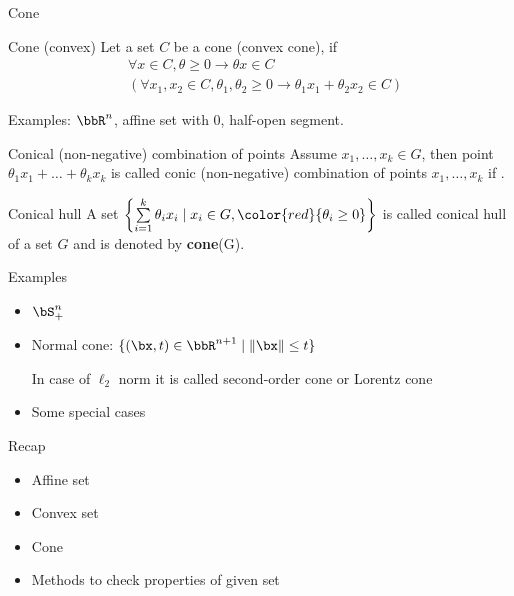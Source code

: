 \documentclass[12pt,russian]{beamer}
\begin{document}
\begin{frame}{Cone}
\small
\begin{block}{Cone (convex)}
Let a set $C$ be a cone (convex cone), if 
\vspace{-4mm}
\begin{equation*}
\begin{split}
& \forall x \in C, \theta \geq 0 \rightarrow \theta x \in C \\
& (\forall x_1, x_2 \in C, \theta_1, \theta_2 \geq 0 \rightarrow \theta_1 x_1 + \theta_2 x_2 \in C)
\end{split}
\end{equation*}
\vspace{-4mm}
\end{block}
Examples: $\bbR^n$, affine set with 0, half-open segment.
\begin{block}{Conical (non-negative) combination of points}
Assume $x_1, \ldots, x_k \in G$, then point $\theta_1 x_1 + \ldots + \theta_k x_k$ is called conic (non-negative) combination of points $x_1,\ldots,x_k$ if {\color{red}{$\theta_i \geq 0$}}.
\end{block}

\begin{block}{Conical hull}
A set $\left\{ \sum\limits_{i=1}^k \theta_i x_i \; | \; x_i \in G, {\color{red}{\theta_i \geq 0}} \right\}$ is called conical hull of a set $G$ and is denoted by \textbf{cone}(G).
\end{block}
\end{frame}

\begin{frame}{Examples}
\begin{itemize}
\item $\bS^n_+$
\item Normal cone: $\{ (\bx, t) \in \bbR^{n+1} \; | \; \| \bx \| \leq t \}$ 

In case of $\ell_2$ norm it is called second-order cone or Lorentz cone
\item Some special cases
\end{itemize}
\end{frame}

\begin{frame}{Recap}
\begin{itemize}
\item Affine set
\item Convex set
\item Cone
\item Methods to check properties of given set
\end{itemize}
\end{frame}
\end{document}
